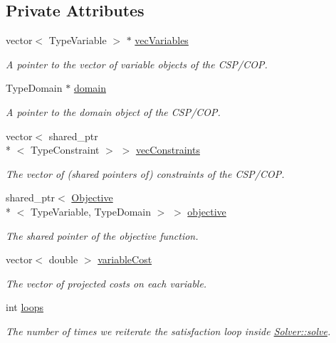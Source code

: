 \subsection*{Private Attributes}
\begin{DoxyCompactItemize}
\item 
vector$<$ Type\-Variable $>$ $\ast$ \hyperlink{classghost_1_1Solver_a2d033a454234b2277aabdcc4d89eaba2}{vec\-Variables}
\begin{DoxyCompactList}\small\item\em A pointer to the vector of variable objects of the C\-S\-P/\-C\-O\-P. \end{DoxyCompactList}\item 
Type\-Domain $\ast$ \hyperlink{classghost_1_1Solver_ad9292e9219261ba8058fec05b453c0c9}{domain}
\begin{DoxyCompactList}\small\item\em A pointer to the domain object of the C\-S\-P/\-C\-O\-P. \end{DoxyCompactList}\item 
vector$<$ shared\-\_\-ptr\\*
$<$ Type\-Constraint $>$ $>$ \hyperlink{classghost_1_1Solver_a170746edcfb777b12978444c2ab3962e}{vec\-Constraints}
\begin{DoxyCompactList}\small\item\em The vector of (shared pointers of) constraints of the C\-S\-P/\-C\-O\-P. \end{DoxyCompactList}\item 
shared\-\_\-ptr$<$ \hyperlink{classghost_1_1Objective}{Objective}\\*
$<$ Type\-Variable, Type\-Domain $>$ $>$ \hyperlink{classghost_1_1Solver_a4fd74bd68d0ea253fd35adad697f964d}{objective}
\begin{DoxyCompactList}\small\item\em The shared pointer of the objective function. \end{DoxyCompactList}\item 
vector$<$ double $>$ \hyperlink{classghost_1_1Solver_a76c1057367112ead0304b436b5f508f1}{variable\-Cost}
\begin{DoxyCompactList}\small\item\em The vector of projected costs on each variable. \end{DoxyCompactList}\item 
int \hyperlink{classghost_1_1Solver_aa6a77e14862a9be467e6c6c76124b526}{loops}
\begin{DoxyCompactList}\small\item\em The number of times we reiterate the satisfaction loop inside \hyperlink{classghost_1_1Solver_a5d15e316f5a4bb8a33c6781058ad0307}{Solver\-::solve}. \end{DoxyCompactList}\item 

\end{DoxyCompactItemize}
